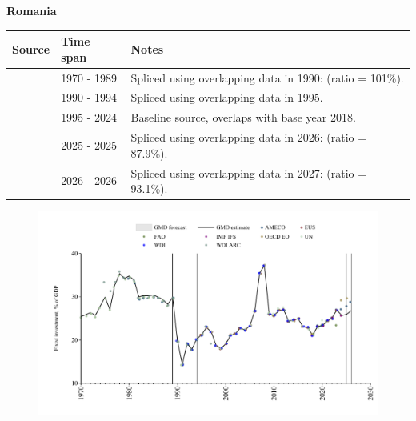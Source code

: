 \documentclass[12pt,a4paper,landscape]{article}
\begin{document}
\begin{adjustbox}{max totalsize={\paperwidth}{\paperheight},center}
\begin{minipage}[t][\textheight][t]{\textwidth}
\vspace*{0.5cm}
{}
\begin{center}
{\Large\bfseries Romania}
\end{center}
\vspace{0.5cm}
\begin{table}[H]
\centering
\small
\begin{tabular}{|l|l|l|}
\hline
\textbf{Source} & \textbf{Time span} & \textbf{Notes} \\
\hline
\rowcolor{white}\cite{UN}& 1970 - 1989 &Spliced using overlapping data in 1990: (ratio = 101\%).\\
\rowcolor{lightgray}\cite{WDI}& 1990 - 1994 &Spliced using overlapping data in 1995.\\
\rowcolor{white}\cite{EUS}& 1995 - 2024 &Baseline source, overlaps with base year 2018.\\
\rowcolor{lightgray}\cite{OECD_EO}& 2025 - 2025 &Spliced using overlapping data in 2026: (ratio = 87.9\%).\\
\rowcolor{white}\cite{AMECO}& 2026 - 2026 &Spliced using overlapping data in 2027: (ratio = 93.1\%).\\
\hline
\end{tabular}
\end{table}
\begin{figure}[H]
\centering
\includegraphics[width=\textwidth,height=0.6\textheight,keepaspectratio]{graphs/ROU_finv_GDP.pdf}
\end{figure}
\end{minipage}
\end{adjustbox}
\end{document}
